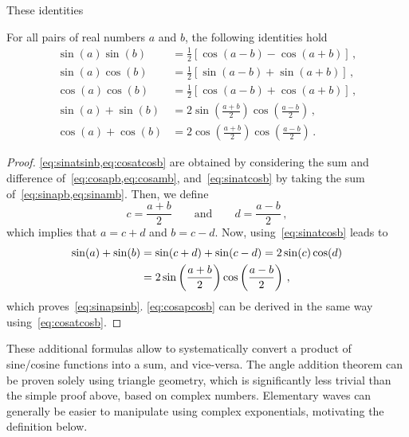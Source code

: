 These identities
\begin{corollary}
  \label{cor:sumproduct}
  For all pairs of real numbers $a$ and $b$, the following identities hold
  \begin{align}
    \sin(a)\sin(b)&=\frac{1}{2}\left[\cos(a-b)-\cos(a+b)\right]\,,
    \label{eq:sinatsinb}\\
    \sin(a)\cos(b)&=\frac{1}{2}\left[\sin(a-b)+\sin(a+b)\right]\,,
    \label{eq:sinatcosb}\\
    \cos(a)\cos(b)&=\frac{1}{2}\left[\cos(a-b)+\cos(a+b)\right]\,,
    \label{eq:cosatcosb}\\
    \sin(a)+\sin(b)&=2\sin\left(\frac{a+b}{2}\right)\cos\left(\frac{a-b}{2}\right)\,,
    \label{eq:sinapsinb}\\
    \cos(a)+\cos(b)&=2\cos\left(\frac{a+b}{2}\right)\cos\left(\frac{a-b}{2}\right)\,.
    \label{eq:cosapcosb}
  \end{align}
\end{corollary}
\begin{proof}
  \cref{eq:sinatsinb,eq:cosatcosb} are obtained by considering the sum and difference
  of~\cref{eq:cosapb,eq:cosamb}, and~\cref{eq:sinatcosb} by taking the sum
  of~\cref{eq:sinapb,eq:sinamb}. Then, we define
  \begin{equation}
    c=\frac{a+b}{2}\qquad\text{and}\qquad d=\frac{a-b}{2}\,,
  \end{equation}
  which implies that $a=c+d$ and $b=c-d$. Now, using~\cref{eq:sinatcosb} leads to
  \begin{align}
    \sin(a)+\sin(b)&=\sin(c+d)+\sin(c-d)=2\sin(c)\cos(d)\notag\\
    &=2\sin\left(\frac{a+b}{2}\right)\cos\left(\frac{a-b}{2}\right)\,,
  \end{align}
  which proves~\cref{eq:sinapsinb}. \cref{eq:cosapcosb} can be derived in the same way
  using~\cref{eq:cosatcosb}.
\end{proof}
These additional formulas allow to systematically convert a product of sine/cosine
functions into a sum, and vice-versa. The angle addition theorem can be proven solely
using triangle geometry, which is significantly less trivial than the simple proof above,
based on complex numbers. Elementary waves can generally be easier to manipulate using
complex exponentials, motivating the definition below.
